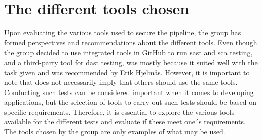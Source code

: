 \section{The different tools chosen}
Upon evaluating the various tools used to secure the pipeline, the group has formed perspectives and recommendations about the different tools. Even though the group decided to use integrated tools in GitHub to run \acrfull{sast} and \acrshort{sca} testing, and a third-party tool for \acrshort{dast} testing, was mostly because it suited well with the task given and was recommended by Erik Hjelmås. However, it is important to note that does not necessarily imply that others should use the same tools. Conducting such tests can be considered important when it comes to developing applications, but the selection of tools to carry out such tests should be based on specific requirements. Therefore, it is essential to explore the various tools available for the different tests and evaluate if these meet one´s requirements. The tools chosen by the group are only examples of what may be used. 


